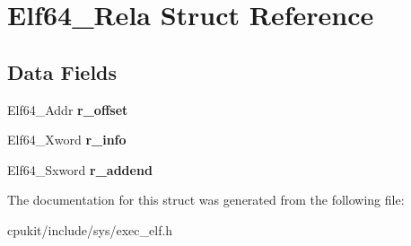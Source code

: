 \hypertarget{structElf64__Rela}{}\section{Elf64\+\_\+\+Rela Struct Reference}
\label{structElf64__Rela}
\subsection*{Data Fields}
\begin{DoxyCompactItemize}
\item 
\mbox{\label{structElf64__Rela_a9ea7e07ec6e0d57bf4bcd53b89de7948}} 
Elf64\+\_\+\+Addr {\bfseries r\+\_\+offset}
\item 
\mbox{\label{structElf64__Rela_aeab8bc0f9035184127ec02d947bf2c76}} 
Elf64\+\_\+\+Xword {\bfseries r\+\_\+info}
\item 
\mbox{\label{structElf64__Rela_a04358b55027a7dcc414e221d916aac64}} 
Elf64\+\_\+\+Sxword {\bfseries r\+\_\+addend}
\end{DoxyCompactItemize}


The documentation for this struct was generated from the following file\+:\begin{DoxyCompactItemize}
\item 
cpukit/include/sys/exec\+\_\+elf.\+h\end{DoxyCompactItemize}

